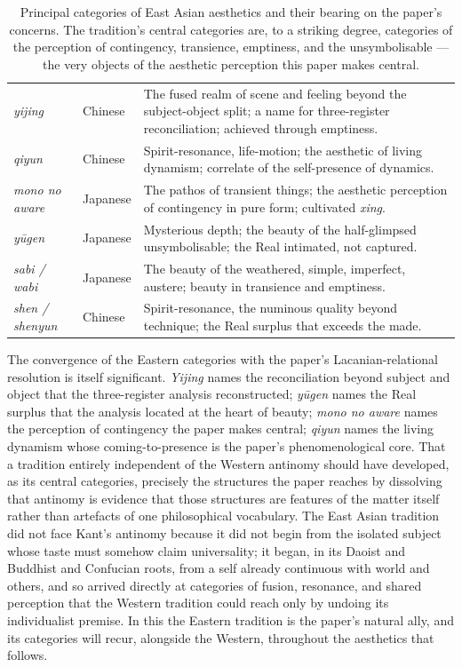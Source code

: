 \begin{table}[ht]
\centering
\small
\begin{tabularx}{\linewidth}{L{2.5cm} L{2.3cm} Z}
 &  &  \\
\midrule
\emph{yijing}  & Chinese & The fused realm of scene and feeling beyond the subject-object split; a name for three-register reconciliation; achieved through emptiness. \\
\emph{qiyun}  & Chinese & Spirit-resonance, life-motion; the aesthetic of living dynamism; correlate of the self-presence of dynamics. \\
\emph{mono no aware}  & Japanese & The pathos of transient things; the aesthetic perception of contingency in pure form; cultivated \emph{xing}. \\
\emph{y\=ugen}  & Japanese & Mysterious depth; the beauty of the half-glimpsed unsymbolisable; the Real intimated, not captured. \\
\emph{sabi / wabi}  & Japanese & The beauty of the weathered, simple, imperfect, austere; beauty in transience and emptiness. \\
\emph{shen / shenyun}  & Chinese & Spirit-resonance, the numinous quality beyond technique; the Real surplus that exceeds the made. \\
\end{tabularx}
\caption{Principal categories of East Asian aesthetics and their bearing on the paper's concerns. The tradition's central categories are, to a striking degree, categories of the perception of contingency, transience, emptiness, and the unsymbolisable --- the very objects of the aesthetic perception this paper makes central.}
\label{p21:tab:eastern-aesthetics}
\end{table}

The convergence of the Eastern categories with the paper's Lacanian-relational resolution is itself significant. \emph{Yijing} names the reconciliation beyond subject and object that the three-register analysis reconstructed; \emph{y\=ugen} names the Real surplus that the analysis located at the heart of beauty; \emph{mono no aware} names the perception of contingency the paper makes central; \emph{qiyun} names the living dynamism whose coming-to-presence is the paper's phenomenological core. That a tradition entirely independent of the Western antinomy should have developed, as its central categories, precisely the structures the paper reaches by dissolving that antinomy is evidence that those structures are features of the matter itself rather than artefacts of one philosophical vocabulary. The East Asian tradition did not face Kant's antinomy because it did not begin from the isolated subject whose taste must somehow claim universality; it began, in its Daoist and Buddhist and Confucian roots, from a self already continuous with world and others, and so arrived directly at categories of fusion, resonance, and shared perception that the Western tradition could reach only by undoing its individualist premise. In this the Eastern tradition is the paper's natural ally, and its categories will recur, alongside the Western, throughout the aesthetics that follows.
